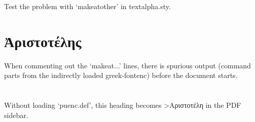 \documentclass{article}
\begin{document}
Test the problem with `makeatother' in textalpha.sty.

\section{Ἀριστοτέλης}

When commenting out the `makeat...' lines, there is
spurious output (command parts from the indirectly loaded greek-fontenc)
before the document starts.

\section{\ensuregreek{\accpsili\textAlpha\textrho\textiota\textsigma\texttau
  \textomicron\texttau\'\textepsilon\textlambda\texteta\textfinalsigma}}

Without loading `puenc.def', this heading becomes
>Αριστοτέλη in the PDF sidebar.
\end{document}
